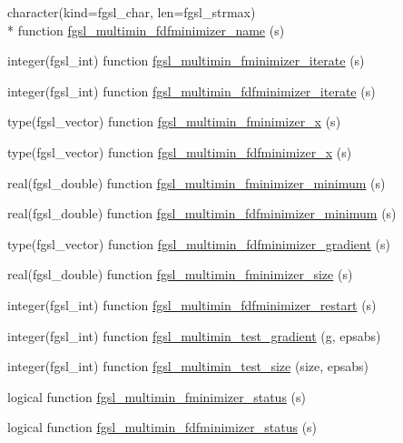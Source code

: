 \begin{DoxyCompactItemize}
\item 
character(kind=fgsl\-\_\-char, len=fgsl\-\_\-strmax) \\*
function \hyperlink{multimin_8finc_add7aec7d233afa06b916d2b936274c41}{fgsl\-\_\-multimin\-\_\-fdfminimizer\-\_\-name} (s)
\item 
integer(fgsl\-\_\-int) function \hyperlink{multimin_8finc_a3197995b850d60e0de902fe245d48bbf}{fgsl\-\_\-multimin\-\_\-fminimizer\-\_\-iterate} (s)
\item 
integer(fgsl\-\_\-int) function \hyperlink{multimin_8finc_ae967ca17e87c39eb2a545c1d710fe3d2}{fgsl\-\_\-multimin\-\_\-fdfminimizer\-\_\-iterate} (s)
\item 
type(fgsl\-\_\-vector) function \hyperlink{multimin_8finc_aa4a9a06fe53544147e23f4c398ea2e3b}{fgsl\-\_\-multimin\-\_\-fminimizer\-\_\-x} (s)
\item 
type(fgsl\-\_\-vector) function \hyperlink{multimin_8finc_a649ffffde4ac9b8567d02ebb30c679b4}{fgsl\-\_\-multimin\-\_\-fdfminimizer\-\_\-x} (s)
\item 
real(fgsl\-\_\-double) function \hyperlink{multimin_8finc_ad82b7976f803bf75a8b762911897a91d}{fgsl\-\_\-multimin\-\_\-fminimizer\-\_\-minimum} (s)
\item 
real(fgsl\-\_\-double) function \hyperlink{multimin_8finc_af074a3128839c747e32a80d7f76ced48}{fgsl\-\_\-multimin\-\_\-fdfminimizer\-\_\-minimum} (s)
\item 
type(fgsl\-\_\-vector) function \hyperlink{multimin_8finc_a831cbe6619ed7b76ae8fe07a2ab3f40b}{fgsl\-\_\-multimin\-\_\-fdfminimizer\-\_\-gradient} (s)
\item 
real(fgsl\-\_\-double) function \hyperlink{multimin_8finc_a78f3abf88b0093e4ca69305e85a78253}{fgsl\-\_\-multimin\-\_\-fminimizer\-\_\-size} (s)
\item 
integer(fgsl\-\_\-int) function \hyperlink{multimin_8finc_ad3a5ccbcbb3cc2029b4790950badeace}{fgsl\-\_\-multimin\-\_\-fdfminimizer\-\_\-restart} (s)
\item 
integer(fgsl\-\_\-int) function \hyperlink{multimin_8finc_ad819b0b49a64995965d3abd7f66f4847}{fgsl\-\_\-multimin\-\_\-test\-\_\-gradient} (g, epsabs)
\item 
integer(fgsl\-\_\-int) function \hyperlink{multimin_8finc_ad9f121a576bee6afbab5fa3c6f8ab5b4}{fgsl\-\_\-multimin\-\_\-test\-\_\-size} (size, epsabs)
\item 
logical function \hyperlink{multimin_8finc_a1a6c440240f101bf70933e5f7a7338ba}{fgsl\-\_\-multimin\-\_\-fminimizer\-\_\-status} (s)
\item 
logical function \hyperlink{multimin_8finc_a39893d424d6495e73046ec17b1c58e69}{fgsl\-\_\-multimin\-\_\-fdfminimizer\-\_\-status} (s)
\end{DoxyCompactItemize}


